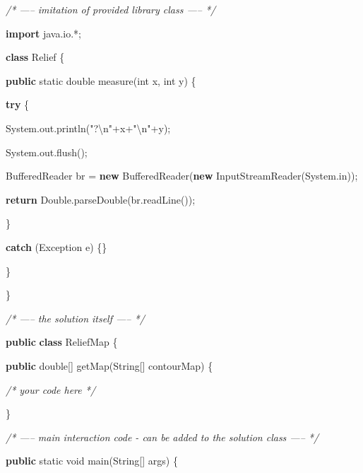 \documentclass[]{article}
\newenvironment{Shaded}{}{}
\newcommand{\BuiltInTok}[1]{#1}
\newcommand{\CommentTok}[1]{\textcolor[rgb]{0.38,0.63,0.69}{\textit{#1}}}
\newcommand{\DataTypeTok}[1]{\textcolor[rgb]{0.56,0.13,0.00}{#1}}
\newcommand{\FunctionTok}[1]{\textcolor[rgb]{0.02,0.16,0.49}{#1}}
\newcommand{\ImportTok}[1]{#1}
\newcommand{\KeywordTok}[1]{\textcolor[rgb]{0.00,0.44,0.13}{\textbf{#1}}}
\newcommand{\NormalTok}[1]{#1}
\newcommand{\SpecialCharTok}[1]{\textcolor[rgb]{0.25,0.44,0.63}{#1}}
\newcommand{\StringTok}[1]{\textcolor[rgb]{0.25,0.44,0.63}{#1}}
\begin{document}
\begin{Shaded}
\begin{Highlighting}[]

\CommentTok{/* ----- imitation of provided library class ----- */}

\KeywordTok{import}\ImportTok{ java.io.*;}

\KeywordTok{class}\NormalTok{ Relief \{}

   \KeywordTok{public} \DataTypeTok{static} \DataTypeTok{double} \FunctionTok{measure}\NormalTok{(}\DataTypeTok{int}\NormalTok{ x, }\DataTypeTok{int}\NormalTok{ y) \{}

     \KeywordTok{try}\NormalTok{ \{}

       \BuiltInTok{System}\NormalTok{.}\FunctionTok{out}\NormalTok{.}\FunctionTok{println}\NormalTok{(}\StringTok{"?}\SpecialCharTok{\textbackslash{}n}\StringTok{"}\NormalTok{+x+}\StringTok{"}\SpecialCharTok{\textbackslash{}n}\StringTok{"}\NormalTok{+y);}

       \BuiltInTok{System}\NormalTok{.}\FunctionTok{out}\NormalTok{.}\FunctionTok{flush}\NormalTok{();}

       \BuiltInTok{BufferedReader}\NormalTok{ br = }\KeywordTok{new} \BuiltInTok{BufferedReader}\NormalTok{(}\KeywordTok{new} \BuiltInTok{InputStreamReader}\NormalTok{(}\BuiltInTok{System}\NormalTok{.}\FunctionTok{in}\NormalTok{));}

       \KeywordTok{return} \BuiltInTok{Double}\NormalTok{.}\FunctionTok{parseDouble}\NormalTok{(br.}\FunctionTok{readLine}\NormalTok{());}

\NormalTok{     \}}

     \KeywordTok{catch}\NormalTok{ (}\BuiltInTok{Exception}\NormalTok{ e) \{\}}

\NormalTok{   \}}

\NormalTok{\}}

\CommentTok{/* ----- the solution itself ----- */}

\KeywordTok{public} \KeywordTok{class}\NormalTok{ ReliefMap \{}

   \KeywordTok{public} \DataTypeTok{double}\NormalTok{[] }\FunctionTok{getMap}\NormalTok{(}\BuiltInTok{String}\NormalTok{[] contourMap) \{}

       \CommentTok{/* your code here */}

\NormalTok{   \}}

\CommentTok{/* ----- main interaction code - can be added to the solution class ----- */}

   \KeywordTok{public} \DataTypeTok{static} \DataTypeTok{void} \FunctionTok{main}\NormalTok{(}\BuiltInTok{String}\NormalTok{[] args) \{}


\end{Highlighting}
\end{Shaded}
\end{document}
